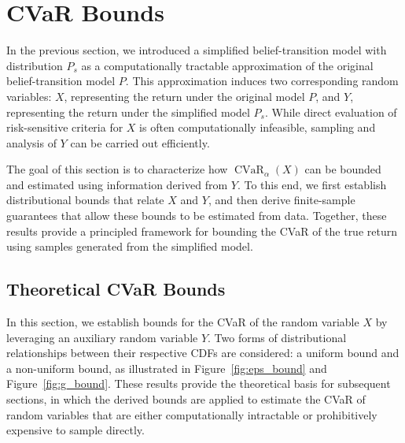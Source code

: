 \documentclass[acmlarge, manuscript, screen, review, natbib=false, oneside]{acmart}
\DeclareMathOperator{\CVaR}{CVaR}
\begin{document}
\section{CVaR Bounds}
In the previous section, we introduced a simplified belief-transition model with distribution $P_s$ as a computationally tractable approximation of the original belief-transition model $P$. This approximation induces two corresponding random variables: $X$, representing the return under the original model $P$, and $Y$, representing the return under the simplified model $P_s$. While direct evaluation of risk-sensitive criteria for $X$ is often computationally infeasible, sampling and analysis of $Y$ can be carried out efficiently.

The goal of this section is to characterize how $\CVaR_\alpha(X)$ can be bounded and estimated using information derived from $Y$. To this end, we first establish distributional bounds that relate $X$ and $Y$, and then derive finite-sample guarantees that allow these bounds to be estimated from data. Together, these results provide a principled framework for bounding the CVaR of the true return using samples generated from the simplified model.

\subsection{Theoretical CVaR Bounds}\label{sec:theoretical_cvar_bounds}
In this section, we establish bounds for the CVaR of the random variable $X$ by leveraging an auxiliary random variable $Y$. Two forms of distributional relationships between their respective CDFs are considered: a uniform bound and a non-uniform bound, as illustrated in Figure~\ref{fig:eps_bound} and Figure~\ref{fig:g_bound}. These results provide the theoretical basis for subsequent sections, in which the derived bounds are applied to estimate the CVaR of random variables that are either computationally intractable or prohibitively expensive to sample directly. 
\end{document}
